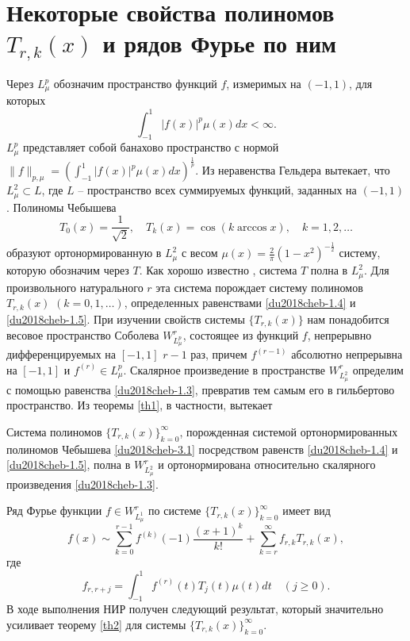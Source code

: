 \section{Некоторые свойства полиномов $T_{r,k}(x)$ и рядов Фурье по ним}
Через $L^p_\mu$ обозначим пространство  функций $f$, измеримых  на  $(-1,1)$, для которых
$$\int_{-1}^1|f(x)|^p\mu(x)dx<\infty.$$
$L^p_\mu$ представляет собой банахово пространство с нормой $\|f\|_{p,\mu}=(\int_{-1}^1|f(x)|^p\mu(x)dx)^\frac1p$. Из неравенства Гельдера вытекает, что $L^2_\mu\subset L$, где $L$ -- пространство всех суммируемых функций, заданных на $(-1,1)$. Полиномы Чебышева
\begin{equation}\label{du2018cheb-3.1}
T_0(x)=\frac{1}{\sqrt{2}},\quad T_k(x)=\cos(k\arccos x), \quad k=1,2,\ldots
\end{equation}
образуют ортонормированную  в $L_\mu^2$ с весом  $\mu(x)=\frac2\pi(1-x^2)^{-\frac12}$ систему, которую обозначим через $T$. Как хорошо известно \cite{Sege}, система $T$ полна в $L_\mu^2$.   Для произвольного натурального $r$ эта система порождает  систему полиномов $T_{r,k}(x)$ $(k=0,1,\ldots)$, определенных равенствами \eqref{du2018cheb-1.4} и \eqref{du2018cheb-1.5}. При изучении свойств системы $\{T_{r,k}(x)\}$ нам понадобится весовое пространство Соболева $W^r_{L^p_\mu}$, состоящее из функций $f$, непрерывно дифференцируемых на $[-1,1]$ $r-1$ раз, причем $f^{(r-1)}$ абсолютно непрерывна на $[-1,1]$  и $f^{(r)}\in L^p_\mu$.
Скалярное произведение в пространстве $W^r_{L^2_\mu}$ определим с помощью равенства
\eqref{du2018cheb-1.3}, превратив тем самым его в гильбертово пространство. Из теоремы \ref{th1}, в частности, вытекает

\begin{theorem}\label{du2018cheb-thC}
	Система полиномов $\{T_{r,k}(x)\}_{k=0}^\infty$, порожденная системой ортонормированных полиномов Чебышева \eqref{du2018cheb-3.1} посредством равенств \eqref{du2018cheb-1.4} и \eqref{du2018cheb-1.5}, полна  в $W^r_{L^2_\mu}$ и ортонормирована относительно скалярного произведения \eqref{du2018cheb-1.3}.
\end{theorem}

Ряд Фурье функции $f\in W_{L_\mu^1}^r$ по системе   $\{T_{r,k}(x)\}_{k=0}^\infty$ имеет вид
\begin{equation}\label{du2018cheb-3.2}
f(x)\sim \sum_{k=0}^{r-1} f^{(k)}(-1)\frac{(x+1)^k}{k!}+ \sum_{k=r}^\infty f_{r,k}T_{r,k}(x),
\end{equation}
где
\begin{equation}\label{du2018cheb-3.3}
f_{r,r+j}=\int_{-1}^1 f^{(r)}(t)T_{j}(t)\mu(t)dt\quad(j\ge0).
\end{equation}
В ходе выполнения НИР получен следующий результат, который значительно усиливает теорему \ref{th2} для системы  $\{T_{r,k}(x)\}_{k=0}^\infty$.

